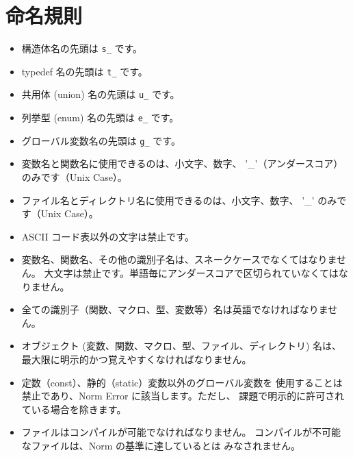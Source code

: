 \documentclass{42-ja}
\begin{document}
    \section{命名規則}

        \begin{itemize}

            \item 構造体名の先頭は
                \texttt{s\_} です。

            \item typedef 名の先頭は
                \texttt{t\_} です。

			\item 共用体 (union) 名の先頭は \texttt{u\_} です。

			\item 列挙型 (enum) 名の先頭は \texttt{e\_} です。

            \item グローバル変数名の先頭は \texttt{g\_} です。

            \item 変数名と関数名に使用できるのは、小文字、数字、
				'\_'（アンダースコア）のみです（Unix Case）。

            \item ファイル名とディレクトリ名に使用できるのは、小文字、数字、
				'\_' のみです（Unix Case）。

            \item ASCII コード表以外の文字は禁止です。

            \item 変数名、関数名、その他の識別子名は、スネークケースでなくてはなりません。
				大文字は禁止です。単語毎にアンダースコアで区切られていなくてはなりません。

            \item 全ての識別子（関数、マクロ、型、変数等）名は英語でなければなりません。

			\item オブジェクト (変数、関数、マクロ、型、ファイル、ディレクトリ)
				名は、最大限に明示的かつ覚えやすくなければなりません。

            \item 定数（const）、静的（static）変数以外のグローバル変数を
				使用することは禁止であり、Norm Error に該当します。ただし、
				課題で明示的に許可されている場合を除きます。

            \item ファイルはコンパイルが可能でなければなりません。
				コンパイルが不可能なファイルは、Norm の基準に達しているとは
				みなされません。
        \end{itemize}
\newpage
\end{document}
